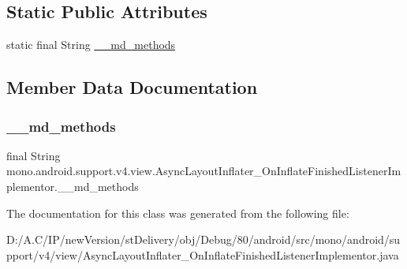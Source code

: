 \subsection*{Static Public Attributes}
\begin{DoxyCompactItemize}
\item 
static final String \hyperlink{classmono_1_1android_1_1support_1_1v4_1_1view_1_1_async_layout_inflater___on_inflate_finished_listener_implementor_a2abef195e903df446ce88048c096ce16}{\+\_\+\+\_\+md\+\_\+methods}
\end{DoxyCompactItemize}


\subsection{Member Data Documentation}
\mbox{\label{classmono_1_1android_1_1support_1_1v4_1_1view_1_1_async_layout_inflater___on_inflate_finished_listener_implementor_a2abef195e903df446ce88048c096ce16}} 
\subsubsection{\texorpdfstring{\+\_\+\+\_\+md\+\_\+methods}{\_\_md\_methods}}
{\footnotesize\ttfamily final String mono.\+android.\+support.\+v4.\+view.\+Async\+Layout\+Inflater\+\_\+\+On\+Inflate\+Finished\+Listener\+Implementor.\+\_\+\+\_\+md\+\_\+methods\hspace{0.3cm}{\ttfamily [static]}}



The documentation for this class was generated from the following file\+:\begin{DoxyCompactItemize}
\item 
D\+:/\+A.\+C/\+I\+P/new\+Version/st\+Delivery/obj/\+Debug/80/android/src/mono/android/support/v4/view/Async\+Layout\+Inflater\+\_\+\+On\+Inflate\+Finished\+Listener\+Implementor.\+java\end{DoxyCompactItemize}
